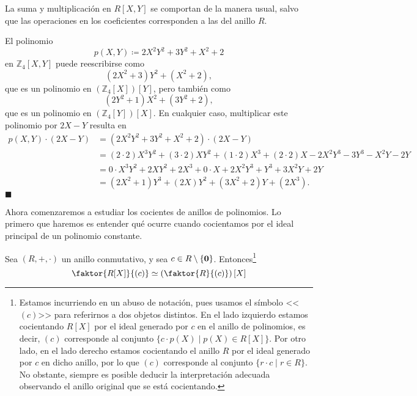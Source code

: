 La suma y multiplicación en $R[X,Y]$ se comportan de la manera usual, salvo que las operaciones en los coeficientes corresponden a las del anillo $R$.

\begin{example}
El polinomio $$p(X, Y) \coloneqq 2X^2Y^2 + 3Y^2 + X^2 + 2$$ en $\mathbb{Z}_4[X,Y]$ puede reescribirse como $$(2X^2 + 3)Y^2 + (X^2+2),$$ que es un polinomio en $(\mathbb{Z}_4[X])[Y]$, pero también como $$(2Y^2 + 1)X^2 + (3Y^2 + 2),$$ que es un polinomio en $(\mathbb{Z}_4[Y])[X]$. En cualquier caso, multiplicar este polinomio por $2X-Y$ resulta en
\begin{align*}
p(X, Y) \cdot (2X-Y) &=
(2X^2Y^2 + 3Y^2 + X^2 + 2) \cdot (2X-Y) \\ &= (2 \cdot 2)X^3Y^2 + (3 \cdot 2)XY^2 + (1 \cdot 2)X^3 + (2 \cdot 2)X - 2X^2Y^3 - 3Y^3 - X^2Y - 2Y \\
&= 0 \cdot X^3Y^2 + 2XY^2 + 2X^3 + 0 \cdot X + 2X^2Y^3 + Y^3 + 3X^2Y + 2Y \\
&= (2X^2 + 1)Y^3 + (2X)Y^2 + (3X^2 + 2)Y + (2X^3).
\end{align*}
\hfill$\blacksquare$
\end{example}

Ahora comenzaremos a estudiar los cocientes de anillos de polinomios. Lo primero que haremos es entender qué ocurre cuando cocientamos por el ideal principal de un polinomio constante.

\begin{proposition} \label{cociente_polinomio_constante}
Sea $(R, +, \cdot)$ un anillo conmutativo, y sea $c \in R \setminus \{ \mathbf{0} \}$. Entonces\footnote{Estamos incurriendo en un abuso de notación, pues usamos el símbolo <<$(c)$>> para referirnos a dos objetos distintos. En el lado izquierdo estamos cocientando $R[X]$ por el ideal generado por $c$ en el anillo de polinomios, es decir, $(c)$ corresponde al conjunto $\{ c  \cdot p(X) \mid p(X) \in R[X] \}$. Por otro lado, en el lado derecho estamos cocientando el anillo $R$ por el ideal generado por $c$ en dicho anillo, por lo que $(c)$ corresponde al conjunto $\{ r \cdot c \mid r \in R \}$. No obstante, siempre es posible deducir la interpretación adecuada observando el anillo original que se está cocientando.}
$$\faktor{R[X]}{(c)} \simeq \left( \faktor{R}{(c)} \right)[X]$$
\end{proposition}

